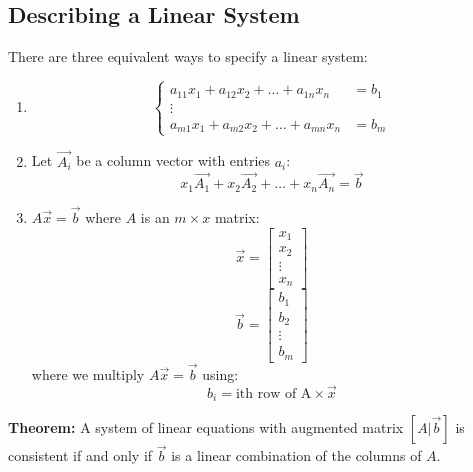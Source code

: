 \documentclass{math}
\begin{document}
\subsection*{Describing a Linear System}
There are three equivalent ways to specify a linear system:
\begin{enumerate}
  \item \[ \begin{cases}
    a_{11}x_1+a_{12}x_2+\dots+a_{1n}x_n &= b_1 \\
    \vdots & \\
    a_{m1}x_1+a_{m2}x_2+\dots+a_{mn}x_n &= b_m
  \end{cases} \]
  \item Let \( \vec{A_i} \) be a column vector with entries \( a_i \):
    \[ x_1\vec{A_1}+x_2\vec{A_2}+\dots+x_n\vec{A_n} = \vec{b} \]
  \item \( A\vec{x} = \vec{b} \) where \( A \) is an \( m\times x \) matrix:
    \[ \vec{x} = \begin{bmatrix}x_1 \\ x_2 \\ \vdots \\ x_n\end{bmatrix} \]
    \[ \vec{b} = \begin{bmatrix}b_1 \\ b_2 \\ \vdots \\ b_m\end{bmatrix} \]
    where we multiply \( A\vec{x} = \vec{b} \) using:
    \[ b_i = \text{ith row of A}\times\vec{x} \]
\end{enumerate}
\textbf{Theorem:} A system of linear equations with augmented matrix
\( [A|\vec{b}] \) is consistent if and only if \( \vec{b} \) is a linear
combination of the columns of \( A \).
\end{document}
